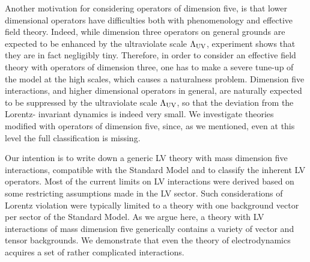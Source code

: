 \documentclass[12pt,preprintnumbers,nofootinbib]{revtex4}
\begin{document}
	Another motivation for considering operators of dimension five,
	is that lower dimensional operators have difficulties both with
	phenomenology and effective field theory.
	Indeed, while dimension three operators on general grounds are
	expected to be enhanced by the ultraviolate scale 
$ \Lambda_{\rm UV} $,
	experiment shows that they are in fact negligibly tiny.
	Therefore, in order to consider an effective field theory with
	operators of dimension three, one has to make a severe tune-up
	of the model at the high scales, which causes a naturalness problem.
	Dimension five interactions, and higher dimensional operators in
	general, are naturally expected to be suppressed by the ultraviolate
	scale $ \Lambda_{\rm UV} $, so that the deviation from the Lorentz-
	invariant dynamics is indeed very small.
	We investigate theories modified with operators of 
	dimension five, since, as we mentioned, even at this level the
	full classification is missing.

	Our intention is to write down a generic LV theory with mass dimension
	five interactions, compatible with the Standard Model and to classify
	the inherent LV operators. 
%
	Most of the current limits on LV interactions were derived based on some
	restricting assumptions made in the LV sector.
	Such considerations of Lorentz violation were typically limited to a theory with
	one background vector per sector of the Standard Model.
	As we argue here, a theory with LV interactions of mass
	dimension five generically contains a variety of vector and tensor 
	backgrounds.
	We demonstrate that even the theory of electrodynamics acquires a set
	of rather complicated interactions. 
\end{document}
